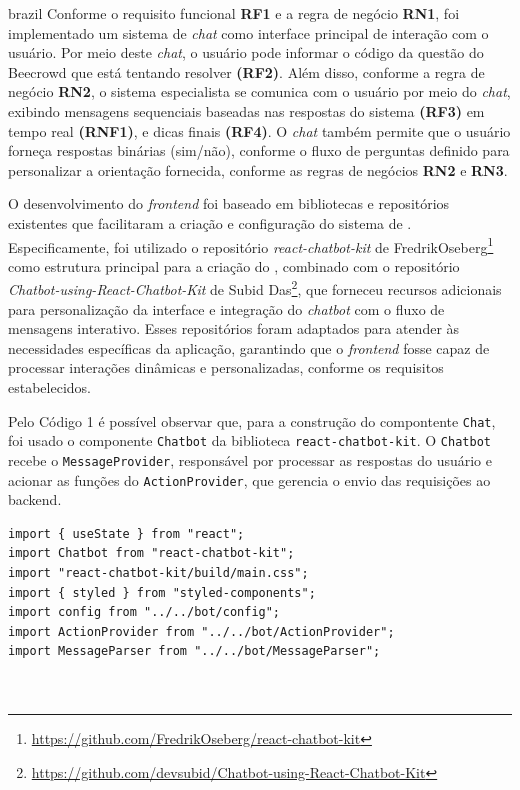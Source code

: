 \begin{otherlanguage*}{brazil}
Conforme o requisito funcional \textbf{RF1} e a regra de negócio \textbf{RN1}, foi implementado um sistema de \textit{chat} como interface principal de interação com o usuário. Por meio deste \textit{chat}, o usuário pode informar o código da questão do Beecrowd que está tentando resolver \textbf{(RF2)}. Além disso, conforme a regra de negócio \textbf{RN2}, o sistema especialista se comunica com o usuário por meio do \textit{chat}, exibindo mensagens sequenciais baseadas nas respostas do sistema \textbf{(RF3)} em tempo real \textbf{(RNF1)}, e dicas finais \textbf{(RF4)}. O \textit{chat} também permite que o usuário forneça respostas binárias (sim/não), conforme o fluxo de perguntas definido para personalizar a orientação fornecida, conforme as regras de negócios \textbf{RN2} e \textbf{RN3}.

O desenvolvimento do \textit{frontend} foi baseado em bibliotecas e repositórios existentes que facilitaram a criação e configuração do sistema de . Especificamente, foi utilizado o repositório \textit{react-chatbot-kit} de FredrikOseberg\footnote{\url{https://github.com/FredrikOseberg/react-chatbot-kit}} como estrutura principal para a criação do , combinado com o repositório \textit{Chatbot-using-React-Chatbot-Kit} de Subid Das\footnote{\url{https://github.com/devsubid/Chatbot-using-React-Chatbot-Kit}}, que forneceu recursos adicionais para personalização da interface e integração do \textit{chatbot} com o fluxo de mensagens interativo. Esses repositórios foram adaptados para atender às necessidades específicas da aplicação, garantindo que o \textit{frontend} fosse capaz de processar interações dinâmicas e personalizadas, conforme os requisitos estabelecidos.

Pelo Código 1 é possível observar que, para a construção do compontente \texttt{Chat}, foi usado o componente \texttt{Chatbot} da biblioteca \texttt{react-chatbot-kit}. O \texttt{Chatbot} recebe o \texttt{MessageProvider}, responsável por processar as respostas do usuário e acionar as funções do \texttt{ActionProvider}, que gerencia o envio das requisições ao backend.

\begin{lstlisting}[style=ufscthesisx_style, caption={Componente Chat}]
import { useState } from "react";
import Chatbot from "react-chatbot-kit";
import "react-chatbot-kit/build/main.css";
import { styled } from "styled-components";
import config from "../../bot/config";
import ActionProvider from "../../bot/ActionProvider";
import MessageParser from "../../bot/MessageParser";



\end{lstlisting}
\end{otherlanguage*}
